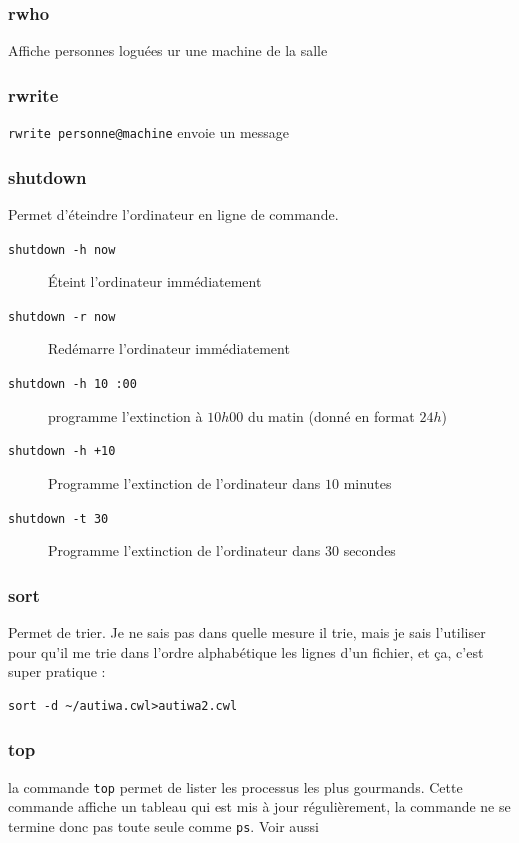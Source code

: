 \documentclass[a4paper,twoside]{article}
\begin{document}
\subsubsection{rwho}
Affiche personnes loguées ur une machine de la salle

\subsubsection{rwrite}
\verb|rwrite personne@machine| envoie un message

\subsubsection{shutdown}
Permet d'éteindre l'ordinateur en ligne de commande.
\begin{description}
\item[\texttt{shutdown -h now}] \'Eteint l'ordinateur immédiatement
\item[\texttt{shutdown -r now}] Redémarre l'ordinateur immédiatement
\item[\texttt{shutdown -h 10 :00}] programme l'extinction à $10h00$ du matin (donné en format $24h$)
\item[\texttt{shutdown -h +10}] Programme l'extinction de l'ordinateur dans $10$ minutes
\item[\texttt{shutdown -t 30}]Programme l'extinction de l'ordinateur dans $30$ secondes

\end{description}

\subsubsection{sort}
Permet de trier. Je ne sais pas dans quelle mesure il trie, mais je sais l'utiliser pour qu'il me trie dans l'ordre alphabétique les lignes d'un fichier, et ça, c'est super pratique :

\begin{verbatim}
sort -d ~/autiwa.cwl>autiwa2.cwl
\end{verbatim}


\subsubsection{top}
la commande \verb|top| permet de lister les processus les plus gourmands. Cette commande affiche un tableau qui est mis à jour régulièrement, la commande ne se termine donc pas toute seule comme \verb|ps|. Voir aussi 
\end{document}
